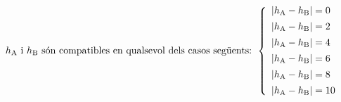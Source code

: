 \begin{equation}
    h_\mathrm{A} \text{ i } h_\mathrm{B} \text{ s\'{o}n compatibles en qualsevol dels casos seg\"{u}ents: }
    \left\{
        \begin{array}{l}
           |h_\mathrm{A} - h_\mathrm{B}| = 0 \\[1ex]
           |h_\mathrm{A} - h_\mathrm{B}| = 2 \\[1ex]
           |h_\mathrm{A} - h_\mathrm{B}| = 4 \\[1ex]
           |h_\mathrm{A} - h_\mathrm{B}| = 6 \\[1ex]
           |h_\mathrm{A} - h_\mathrm{B}| = 8 \\[1ex]
           |h_\mathrm{A} - h_\mathrm{B}| = 10
        \end{array}
    \right.
    \label{eq:index_comp}
\end{equation}
\pagebreak

